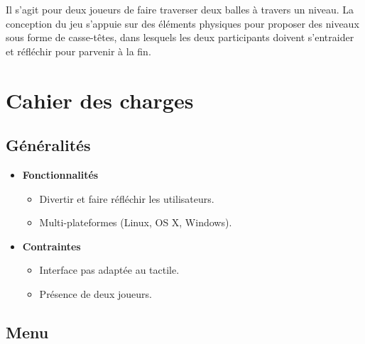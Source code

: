 Il s’agit pour deux joueurs de faire traverser deux
balles à travers un niveau.
La conception du jeu s’appuie sur des éléments physiques pour proposer des
niveaux sous forme de casse-têtes, dans lesquels les deux participants doivent
s’entraider et réfléchir pour parvenir à la fin.

%
\section{Cahier des charges}


\subsection{Généralités}

\begin{itemize}
    \item \textbf{Fonctionnalités}
    \begin{itemize}
        \item Divertir et faire réfléchir les utilisateurs.
        \item Multi-plateformes (Linux, OS X, Windows).
    \end{itemize}

    \item \textbf{Contraintes}
    \begin{itemize}
        \item Interface pas adaptée au tactile.
        \item Présence de deux joueurs.
    \end{itemize}
\end{itemize}

\subsection{Menu}


